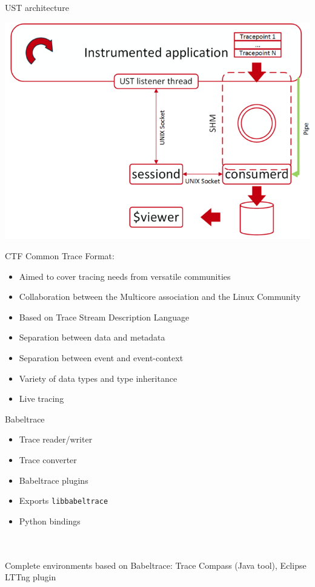 \begin{frame}{UST architecture}
\begin{center}
\includegraphics[scale=0.5]{images/ust-architecture.png}
\end{center}
\end{frame}

\begin{frame}{CTF}
Common Trace Format:
\hfill \\
\begin{itemize}
\item Aimed to cover tracing needs from versatile communities
\item Collaboration between the Multicore association and the Linux Community
\item Based on Trace Stream Description Language
\item Separation between data and metadata
\item Separation between event and event-context
\item Variety of data types and type inheritance
\item Live tracing
\end{itemize}
\end{frame}

\begin{frame}{Babeltrace}
\begin{itemize}
\item Trace reader/writer
\item Trace converter
\item Babeltrace plugins
\item Exports \texttt{libbabeltrace}
\item Python bindings
\end{itemize}
\hfill \\
\hfill \\
Complete environments based on Babeltrace: Trace Compass (Java tool), Eclipse
LTTng plugin
\end{frame}
